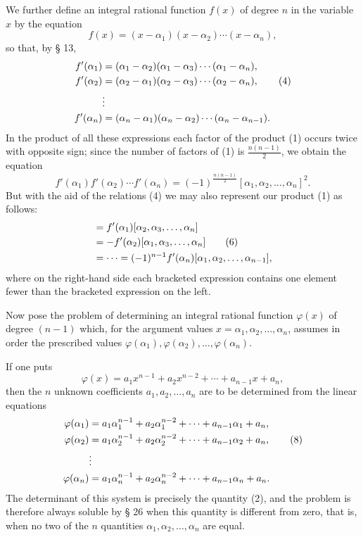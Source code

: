 \documentclass[11pt]{article}
\begin{document}
We further define an integral rational function $f(x)$ of degree $n$ in the variable $x$ by the equation
\begin{equation}
 f(x)=(x-\alpha_1)(x-\alpha_2)\cdots(x-\alpha_n),\tag{3}
\end{equation}
so that, by § 13,
\begin{align}
 f'(\alpha_1)&=(\alpha_1-\alpha_2)(\alpha_1-\alpha_3)\cdots(\alpha_1-\alpha_n),\notag\\
 f'(\alpha_2)&=(\alpha_2-\alpha_1)(\alpha_2-\alpha_3)\cdots(\alpha_2-\alpha_n),\tag{4}\\
 &\vdots\notag\\
 f'(\alpha_n)&=(\alpha_n-\alpha_1)(\alpha_n-\alpha_2)\cdots(\alpha_n-\alpha_{n-1}).\notag
\end{align}
In the product of all these expressions each factor of the product (1) occurs twice with opposite sign; since the number of factors of (1) is $\frac{n(n-1)}2$, we obtain the equation
\begin{equation}
 f'(\alpha_1)f'(\alpha_2)\cdots f'(\alpha_n)=(-1)^{\frac{n(n-1)}2}[\alpha_1,\alpha_2,\ldots,\alpha_n]^2.\tag{5}
\end{equation}
But with the aid of the relations (4) we may also represent our product (1) as follows:
\begin{align}
 [\alpha_1,\alpha_2,\ldots,\alpha_n]
 &= f'(\alpha_1)[\alpha_2,\alpha_3,\ldots,\alpha_n]\notag\\
 &=-f'(\alpha_2)[\alpha_1,\alpha_3,\ldots,\alpha_n]\tag{6}\\
 &=\cdots=(-1)^{n-1}f'(\alpha_n)[\alpha_1,\alpha_2,\ldots,\alpha_{n-1}],\notag
\end{align}
where on the right-hand side each bracketed expression contains one element fewer than the bracketed expression on the left.

Now pose the problem of determining an integral rational function $\varphi(x)$ of degree $(n-1)$ which, for the argument values $x=\alpha_1,\alpha_2,
\ldots,\alpha_n$, assumes in order the prescribed values $\varphi(\alpha_1),\varphi(\alpha_2),\ldots,\varphi(\alpha_n)$.

If one puts
\begin{equation}
 \varphi(x)=a_1x^{n-1}+a_2x^{n-2}+\cdots+a_{n-1}x+a_n,\tag{7}
\end{equation}
then the $n$ unknown coefficients $a_1,a_2,
\ldots,a_n$ are to be determined from the linear equations
\begin{align}
 \varphi(\alpha_1)&=a_1\alpha_1^{n-1}+a_2\alpha_1^{n-2}+\cdots+a_{n-1}\alpha_1+a_n,\notag\\
 \varphi(\alpha_2)&=a_1\alpha_2^{n-1}+a_2\alpha_2^{n-2}+\cdots+a_{n-1}\alpha_2+a_n,\tag{8}\\
 &\vdots\notag\\
 \varphi(\alpha_n)&=a_1\alpha_n^{n-1}+a_2\alpha_n^{n-2}+\cdots+a_{n-1}\alpha_n+a_n.\notag
\end{align}
The determinant of this system is precisely the quantity (2), and the problem is therefore always soluble by § 26 when this quantity is different from zero, that is, when no two of the $n$ quantities $\alpha_1,\alpha_2,
\ldots,\alpha_n$ are equal.
\end{document}
